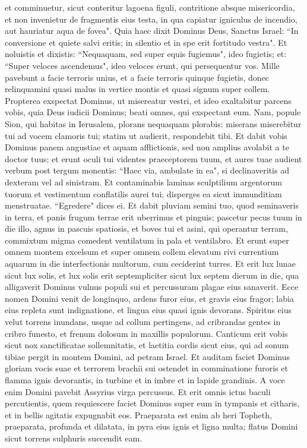 \begin{biblechapter}
\verse et comminuetur, sicut conteritur lagoena figuli, contritione absque misericordia, et non invenietur de fragmentis eius testa, in qua capiatur igniculus de incendio, aut hauriatur aqua de fovea". 
\verse Quia haec dixit Dominus Deus, Sanctus Israel: “In conversione et quiete salvi eritis; in silentio et in spe erit fortitudo vestra". Et noluistis 
\verse et dixistis: “Nequaquam, sed super equis fugiemus", ideo fugietis; et: “Super veloces ascendemus", ideo veloces erunt, qui persequentur vos. 
\verse Mille pavebunt a facie terroris unius, et a facie terroris quinque fugietis, donec relinquamini quasi malus in vertice montis et quasi signum super collem. 
\verse Propterea exspectat Dominus, ut misereatur vestri, et ideo exaltabitur parcens vobis, quia Deus iudicii Dominus; beati omnes, qui exspectant eum. 
\verse Nam, popule Sion, qui habitas in Ierusalem, plorans nequaquam plorabis: miserans miserebitur tui ad vocem clamoris tui; statim ut audierit, respondebit tibi. 
\verse Et dabit vobis Dominus panem angustiae et aquam afflictionis, sed non amplius avolabit a te doctor tuus; et erunt oculi tui videntes praeceptorem tuum, 
\verse et aures tuae audient verbum post tergum monentis: “Haec via, ambulate in ea", si declinaveritis ad dexteram vel ad sinistram. 
\verse Et contaminabis laminas sculptilium argentorum tuorum et vestimentum conflatilis aurei tui; disperges ea sicut immunditiam menstruatae. “Egredere" dices ei. 
\verse Et dabit pluviam semini tuo, quod seminaveris in terra, et panis frugum terrae erit uberrimus et pinguis; pascetur pecus tuum in die illo, agnus in pascuis spatiosis, 
\verse et boves tui et asini, qui operantur terram, commixtum migma comedent ventilatum in pala et ventilabro. 
\verse Et erunt super omnem montem excelsum et super omnem collem elevatum rivi currentium aquarum in die interfectionis multorum, cum ceciderint turres. 
\verse Et erit lux lunae sicut lux solis, et lux solis erit septempliciter sicut lux septem dierum in die, qua alligaverit Dominus vulnus populi sui et percussuram plagae eius sanaverit. 
\verse Ecce nomen Domini venit de longinquo, ardens furor eius, et gravis eius fragor; labia eius repleta sunt indignatione, et lingua eius quasi ignis devorans. 
\verse Spiritus eius velut torrens inundans, usque ad collum pertingens, ad cribrandas gentes in cribro funesto, et frenum dolosum in maxillis populorum. 
\verse Canticum erit vobis sicut nox sanctificatae sollemnitatis, et laetitia cordis sicut eius, qui ad sonum tibiae pergit in montem Domini, ad petram Israel. 
\verse Et auditam faciet Dominus gloriam vocis suae et terrorem brachii sui ostendet in comminatione furoris et flamma ignis devorantis, in turbine et in imbre et in lapide grandinis. 
\verse A voce enim Domini pavebit Assyrius virga percussus. 
\verse Et erit omnis ictus baculi percutientis, quem requiescere faciet Dominus super eum in tympanis et citharis, et in bellis agitatis expugnabit eos. 
\verse Praeparata est enim ab heri Topheth, praeparata, profunda et dilatata, in pyra eius ignis et ligna multa; flatus Domini sicut torrens sulphuris succendit eam. 
\end{biblechapter}


